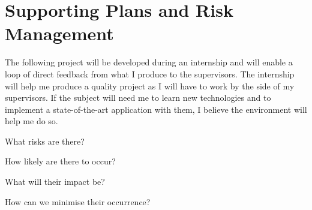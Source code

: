 
\section{Supporting Plans and Risk Management}


The following project will be developed during an internship and will enable a loop of direct feedback from what I produce to the supervisors. The internship will help me produce a quality project as I will have to work by the side of my supervisors. If the subject will need me to learn new technologies and to implement a state-of-the-art application with them, I believe the environment will help me do so.

What risks are there?

How likely are there to occur?

What will their impact be?

How can we minimise their occurrence?
